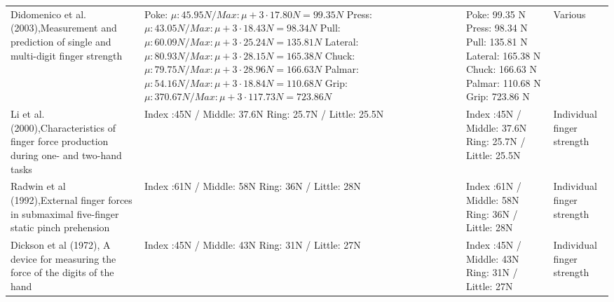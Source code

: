 \documentclass[main]{subfiles}
\begin{document}
\begin{longtable}{p{5.2cm}|p{4.2cm}|p{3.7cm}|p{1.7cm}}
Didomenico et al. (2003),Measurement and prediction of single and multi-digit finger strength \cite{Didomenico2003} & 
	Poke: $\mu:45.95 N /Max: \mu + 3 \cdot 17.80 N = 99.35 N$\newline 
Press: $\mu:43.05 N /Max: \mu + 3 \cdot 18.43 N = 98.34 N$ \newline
Pull: $\mu:60.09 N /Max: \mu + 3 \cdot 25.24 N = 135.81 N$\newline
Lateral: $\mu:80.93 N /Max: \mu + 3 \cdot 28.15 N = 165.38 N$ \newline
Chuck: $\mu:79.75 N /Max: \mu + 3 \cdot 28.96 N = 166.63 N$ \newline
Palmar: $\mu:54.16 N /Max: \mu + 3 \cdot 18.84 N = 110.68 N$ \newline
Grip: $\mu:370.67 N /Max: \mu + 3 \cdot 117.73 N = 723.86 N$ \newline& 
Poke: 99.35 N \newline
Press: 98.34 N \newline
Pull: 135.81 N \newline
Lateral: 165.38 N \newline
Chuck: 166.63 N \newline
Palmar: 110.68 N \newline
Grip: 723.86 N \newline & Various\\

Li et al. (2000),Characteristics of finger force production during one- and two-hand tasks \cite{Li2000} & Index :45N / Middle: 37.6N \newline Ring: 25.7N / Little: 25.5N & Index :45N / Middle: 37.6N \newline Ring: 25.7N / Little: 25.5N & Individual finger strength\\

Radwin et al (1992),External finger forces in submaximal five-finger static pinch prehension \cite{Radwin1992} & Index :61N / Middle: 58N \newline Ring: 36N / Little: 28N & Index :61N / Middle: 58N \newline Ring: 36N / Little: 28N & Individual finger strength\\

Dickson et al (1972), A device for measuring the force of the digits of the hand \cite{Dickson1972} & Index :45N / Middle: 43N \newline Ring: 31N / Little: 27N & Index :45N / Middle: 43N \newline Ring: 31N / Little: 27N & Individual finger strength\\


\end{longtable}
\end{document}
